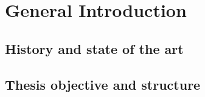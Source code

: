 	
			
	

	
\chapter{General Introduction}
\label{chap:intro}
\newpage

\section{History and state of the art}
\label{sec:intro:hist_soa}
\newpage



\section{Thesis objective and structure}
\label{sec:intro:obj_and_struct}








%
%

